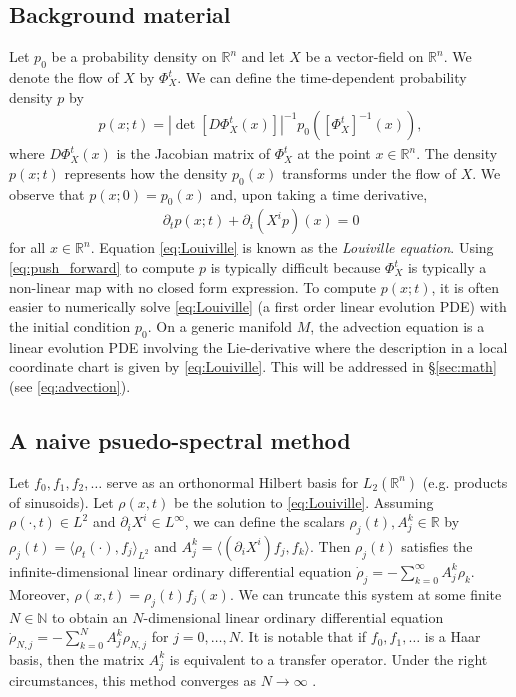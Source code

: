 \documentclass[letterpaper, 10 pt, conference]{ieeeconf}
\newcommand{\R}{\mathbb{R}}
\begin{document}
\subsection{Background material}
  Let $p_0$ be a probability density on $\R^n$
  and let $X$ be a vector-field on $\R^n$.
  We denote the flow of $X$
  by $\Phi_X^t$.
  We can define the time-dependent probability
  density $p$ by
  \begin{align}
    p( x ; t) = 
    \left| \det\left[ D\Phi_X^t(x) \right] \right|^{-1} p_0\left( \left[\Phi_X^t\right]^{-1}(x) \right), \label{eq:push_forward}
  \end{align}
  where $D\Phi_X^t(x)$ is the Jacobian matrix of
  $\Phi_X^t$ at the point $x \in \R^n$.
  The density $p(x;t)$ represents how the density
  $p_0(x)$ transforms under the flow of $X$.
  We observe that $p(x;0) = p_0(x)$ and, upon taking
  a time derivative,
  \begin{align}
    \partial_t p (x;t) + \partial_i (X^i p)(x) = 0 \label{eq:Louiville}
  \end{align}
  for all $x \in \R^n$.
  Equation \eqref{eq:Louiville} is known as the \emph{Louiville equation}.
  Using \eqref{eq:push_forward} to compute $p$ is typically difficult
  because $\Phi_X^t$ is typically a non-linear map with no closed
  form expression.
  To compute $p( x ; t)$, it is often easier
  to numerically solve \eqref{eq:Louiville}
  (a first order linear evolution PDE)
  with the initial condition $p_0$.
  On a generic manifold $M$, the advection equation is a linear
  evolution PDE involving the Lie-derivative
  where the description in a local coordinate chart is
  given by \eqref{eq:Louiville}.
  This will be addressed in \S \ref{sec:math} (see \eqref{eq:advection}).

\subsection{A naive psuedo-spectral method}
\label{sec:naive}
  Let $f_0,f_1,f_2,\dots$ serve as an
  orthonormal Hilbert basis
  for $L_2(\R^n)$ (e.g. products of sinusoids).
  Let $\rho(x,t)$ be the solution to \eqref{eq:Louiville}.
  Assuming $\rho(\cdot,t) \in L^2$ and $\partial_i X^i \in L^{\infty}$,
  we can define the scalars $\rho_j(t), A^k_j \in \R$
  by $\rho_j(t) = \langle \rho_t( \cdot ) , f_j \rangle_{L^2}$
  and $A^k_j = \langle (\partial_i X^i) f_j , f_k \rangle$.
  Then $\rho_j(t)$ satisfies the infinite-dimensional linear
  ordinary differential equation
  $
    \dot{\rho}_j = - \sum_{k=0}^{\infty}A^k_j \rho_k
  $.
  Moreover, $\rho(x,t) = \rho_j(t) f_j(x)$.
  We can truncate this system at some finite $N \in \mathbb{N}$
  to obtain an $N$-dimensional linear ordinary differential equation
  $\dot{\rho}_{N,j} = -\sum_{k=0}^{N} A^k_j \rho_{N,j}$ for $j=0,\dots,N$.
  It is notable that if $f_0,f_1,\dots$ is a Haar basis, then the matrix
  $A^k_j$ is equivalent to a transfer operator.
  Under the right circumstances,
  this method converges as $N \to \infty$
  \cite{FroylandJungeKoltai2013}.
\end{document}
